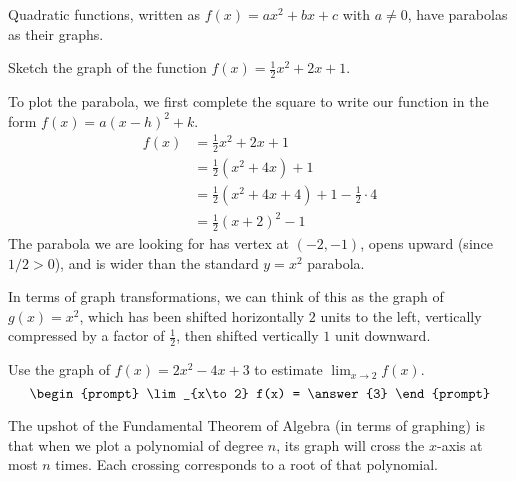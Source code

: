 \documentclass{ximera}
\begin{document}
Quadratic functions, written as $f(x) = ax^2 + bx + c$ with $a \ne 0$, have parabolas as their graphs.
\begin{example}
	Sketch the graph of the function $f(x) = \frac{1}{2} x^2 + 2x + 1$.
	\begin{explanation}
		To plot the parabola, we first complete the square to write our function in the form $f(x) = a(x-h)^2 +k$.
		\begin{align*}
			f(x) &= \frac{1}{2} x^2 + 2x + 1 \\
				&= \frac{1}{2} \left( x^2+ 4x \right) + 1\\
				&= \frac{1}{2}\left( x^2 + 4x + 4\right) + 1 - \frac{1}{2} \cdot 4\\
				&= \frac{1}{2} \left( x+2 \right)^2 -1
		\end{align*}
		The parabola we are looking for has vertex at $(-2, -1)$, opens upward (since $1/2 > 0$), and is wider than the standard
		$y=x^2$ parabola.
		
		In terms of graph transformations, we can think of this as the graph of $g(x) = x^2$, which has been shifted horizontally $2$ units to the left,
		vertically compressed by a factor of $\frac{1}{2}$, then shifted vertically $1$ unit downward.
	\end{explanation}
\end{example}


\begin{problem}
	Use the graph of $f(x) = 2x^2 - 4x + 3$ to estimate $\lim_{x\to 2} f(x)$.
	\[ \begin{prompt} 
		\lim_{x\to 2} f(x) = \answer{3} 
	\end{prompt}\]
\end{problem} 



The upshot of the Fundamental Theorem of Algebra (in terms of graphing) is that when we plot a
polynomial of degree $n$, its graph will cross the $x$-axis at most
$n$ times.  Each crossing corresponds to a root of that polynomial.
\end{document}
